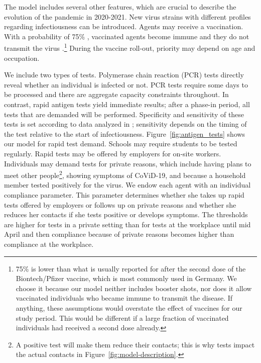 The model includes several other features, which are crucial to describe the evolution
of the pandemic in 2020-2021. New virus strains with different profiles regarding
infectiousness can be introduced. Agents may receive a vaccination. With a probability
of 75\% \citep{Hunter2021}, vaccinated agents become immune and they do not transmit the
virus \citep{Petter2021, LevineTiefenbrun2021, Pritchard2021}.\footnote{75\% is lower
    than what is usually reported for after the second dose of the Biontech/Pfizer vaccine,
    which is most commonly used in Germany. We choose it because our model neither includes
    booster shots, nor does it allow vaccinated individuals who became immune to transmit
    the disease\citep{Petter2021, LevineTiefenbrun2021, Pritchard2021}. If anything, these
    assumptions would overstate the effect of vaccines for our study period. This would be
    different if a large fraction of vaccinated individuals had received a second dose
    already.} During the vaccine roll-out, priority may depend on age and occupation.

We include two types of tests. Polymerase chain reaction (PCR) tests directly reveal
whether an individual is infected or not. PCR tests require some days to be processed
and there are aggregate capacity constraints throughout. In contrast, rapid antigen
tests yield immediate results; after a phase-in period, all tests that are demanded will
be performed. Specificity and sensitivity of these tests is set according to data
analyzed in \cite{Bruemmer2021, Smith2021}; sensitivity depends on the timing of the
test relative to the start of infectiousness. Figure~\ref{fig:antigen_tests} shows our
model for rapid test demand. Schools may require students to be tested regularly. Rapid
tests may be offered by employers for on-site workers. Individuals may demand tests for
private reasons, which include having plans to meet other people\footnote{A positive
    test will make them reduce their contacts; this is why tests impact the actual contacts
    in Figure~\ref{fig:model-description}.}, showing symptoms of CoViD-19, and because a
household member tested positively for the virus. We endow each agent with an individual
compliance parameter. This parameter determines whether she takes up rapid tests offered
by employers or follows up on private reasons and whether she reduces her contacts if
she tests positive or develops symptoms. The thresholds are higher for tests in a
private setting than for tests at the workplace until mid April and then compliance
because of private reasons becomes higher than compliance at the workplace.


